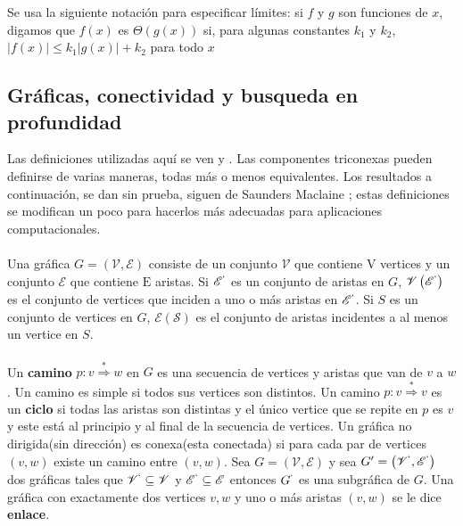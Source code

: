 Se usa la siguiente notación para especificar límites: si $f$ y $g$ son funciones de $x$, digamos que $f\left(x\right)$ es $\Theta\left(g\left(x\right)\right)$ si, para algunas constantes $k_{1}$ y $k_{2}$, $\left|f\left(x\right)\right| \leq k_{1}\left|g\left(x\right)\right| + k_{2}$ para todo $x$\\

\subsection{Gráficas, conectividad y busqueda en profundidad}

Las definiciones utilizadas aquí se ven \citep{busacker1965finite} y \citep{harary1971graph}. Las componentes triconexas pueden definirse de varias maneras, todas más o menos equivalentes. Los resultados a continuación, se dan sin prueba, siguen de Saunders Maclaine \citep{mac-lane-1937}; estas definiciones se modifican un poco para hacerlos más adecuadas para aplicaciones computacionales.\\

\paragraph{}
Una gráfica $G = \left(\mathscr{V},\mathscr{E}\right)$ consiste de un conjunto $\mathscr{V}$ que contiene $\mathrm{V}$ vertices y un conjunto $\mathscr{E}$ que contiene $\mathrm{E}$ aristas. Si $\mathscr{E}^{`}$ es un conjunto de aristas en $G$, $\mathscr{V}\left(\mathscr{E}^{`}\right)$ es el conjunto de vertices que inciden a uno o más aristas en $\mathscr{E}^{`}$. Si $S$ es un conjunto de vertices en $G$, $\mathscr{E}\left(\mathscr{S}\right)$  es el conjunto de aristas incidentes a al menos un vertice en $S$.

\paragraph{}
Un \textbf{camino} $p:v \overset{\ast}{\Rightarrow} w$ en $G$ es una secuencia de vertices y aristas que van de $v$ a $w$. Un camino es simple si todos sus vertices son distintos. Un camino $p:v \overset{\ast}{\Rightarrow} v$ es un \textbf{ciclo} si todas las aristas son distintas y el único vertice que se repite en $p$ es $v$ y este está al principio y al final de la secuencia de vertices. Un gráfica no dirigida(sin dirección) es conexa(esta conectada) si para cada par de vertices $(v, w)$ existe un camino entre $(v,w)$. Sea $G= \left(\mathscr{V},\mathscr{E}\right)$ y sea $G' =  \left(\mathscr{V}^{`},\mathscr{E}^{`}\right)$ dos gráficas tales que $\mathscr{V}^{`}\subseteq\mathscr{V}$ y $\mathscr{E}^{`}\subseteq \mathscr{E}$ entonces $G^{`}$ es una subgráfica de $G$. Una gráfica con exactamente dos vertices $v,w$ y uno o más aristas $\left(v,w\right)$ se le dice \textbf{enlace}.

